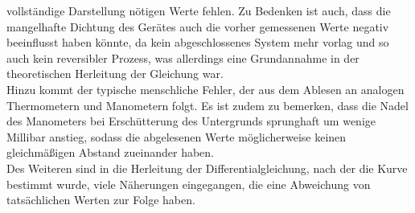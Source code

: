 vollständige Darstellung nötigen Werte fehlen. Zu Bedenken ist auch, dass die mangelhafte Dichtung des Gerätes auch die vorher gemessenen Werte negativ beeinflusst haben 
könnte, da kein abgeschlossenes System mehr vorlag und so auch kein reversibler Prozess, was allerdings eine Grundannahme in der theoretischen Herleitung der Gleichung war. \\
Hinzu kommt der typische menschliche Fehler, der aus dem Ablesen an analogen Thermometern und Manometern folgt. Es ist zudem zu bemerken, dass die Nadel des Manometers bei 
Erschütterung des Untergrunds sprunghaft um wenige Millibar anstieg, sodass die abgelesenen Werte möglicherweise keinen gleichmäßigen Abstand zueinander haben. \\
Des Weiteren sind in die Herleitung der Differentialgleichung, nach der die Kurve bestimmt wurde, viele Näherungen eingegangen, die eine Abweichung von tatsächlichen Werten
zur Folge haben.
